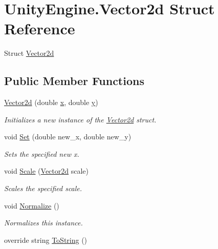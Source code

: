 \hypertarget{struct_unity_engine_1_1_vector2d}{}\section{Unity\+Engine.\+Vector2d Struct Reference}
\label{struct_unity_engine_1_1_vector2d}


Struct \hyperlink{struct_unity_engine_1_1_vector2d}{Vector2d}  


\subsection*{Public Member Functions}
\begin{DoxyCompactItemize}
\item 
\hyperlink{struct_unity_engine_1_1_vector2d_a04f770eca6bf089346578fbe02d2a85d}{Vector2d} (double \hyperlink{struct_unity_engine_1_1_vector2d_ac730b1953750d27bc7adfdd55188d2f3}{x}, double \hyperlink{struct_unity_engine_1_1_vector2d_a85b7ce21094a46c2f68cd734cfa11729}{y})
\begin{DoxyCompactList}\small\item\em Initializes a new instance of the \hyperlink{struct_unity_engine_1_1_vector2d}{Vector2d} struct. \end{DoxyCompactList}\item 
void \hyperlink{struct_unity_engine_1_1_vector2d_a9d112a98ba6be5be962139b335bef50a}{Set} (double new\+\_\+x, double new\+\_\+y)
\begin{DoxyCompactList}\small\item\em Sets the specified new x. \end{DoxyCompactList}\item 
void \hyperlink{struct_unity_engine_1_1_vector2d_a3cedcd488480122404c3571e151af24e}{Scale} (\hyperlink{struct_unity_engine_1_1_vector2d}{Vector2d} scale)
\begin{DoxyCompactList}\small\item\em Scales the specified scale. \end{DoxyCompactList}\item 
void \hyperlink{struct_unity_engine_1_1_vector2d_ae1c2b2abc1d444137f3e427927919aee}{Normalize} ()
\begin{DoxyCompactList}\small\item\em Normalizes this instance. \end{DoxyCompactList}\item 
override string \hyperlink{struct_unity_engine_1_1_vector2d_a0e32225a9621ae1a91e11852b9dae864}{To\+String} ()

\end{DoxyCompactItemize}
